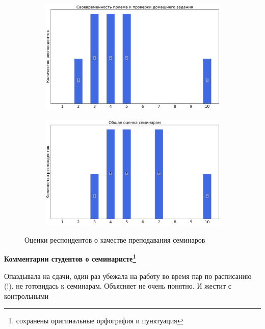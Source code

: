 \begin{figure}[H]
\begin{subfigure}[b]{0.45\textwidth}
                \includegraphics[width=\textwidth]{images/3 course/Теория поля/seminarists-marks-Девизорова Ж.А.-2.png}
            \end{subfigure}
            \begin{subfigure}[b]{0.45\textwidth}
                \centering
                \includegraphics[width=\textwidth]{images/3 course/Теория поля/seminarists-marks-Девизорова Ж.А.-3.png}
            \end{subfigure}	
            \caption{Оценки респондентов о качестве преподавания семинаров}
        \end{figure}

        \textbf{Комментарии студентов о семинаристе\protect\footnote{сохранены оригинальные орфография и пунктуация}}
            \begin{commentbox} 
                Опаздывала на сдачи, один раз убежала на работу во время пар по расписанию (!), не готовидась к семинарам. Объясняет не очень понятно. И жестит с контрольными  
            \end{commentbox} 
        
